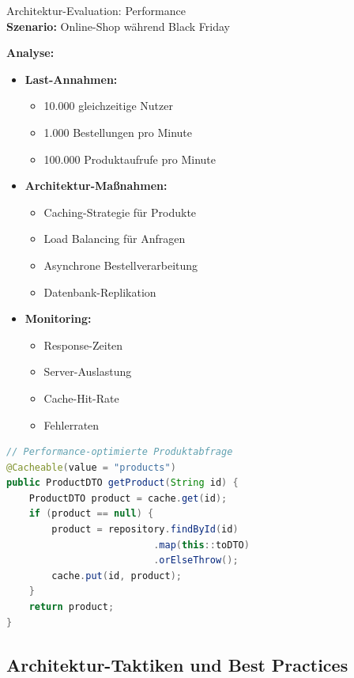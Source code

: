 \begin{example2}{Architektur-Evaluation: Performance}\\
\textbf{Szenario:} Online-Shop während Black Friday

\textbf{Analyse:}
\begin{itemize}
    \item \textbf{Last-Annahmen:}
    \begin{itemize}
        \item 10.000 gleichzeitige Nutzer
        \item 1.000 Bestellungen pro Minute
        \item 100.000 Produktaufrufe pro Minute
    \end{itemize}
    
    \item \textbf{Architektur-Maßnahmen:}
    \begin{itemize}
        \item Caching-Strategie für Produkte
        \item Load Balancing für Anfragen
        \item Asynchrone Bestellverarbeitung
        \item Datenbank-Replikation
    \end{itemize}
    
    \item \textbf{Monitoring:}
    \begin{itemize}
        \item Response-Zeiten
        \item Server-Auslastung
        \item Cache-Hit-Rate
        \item Fehlerraten
    \end{itemize}
\end{itemize}

\begin{lstlisting}[language=Java, style=basesmol]
// Performance-optimierte Produktabfrage
@Cacheable(value = "products")
public ProductDTO getProduct(String id) {
    ProductDTO product = cache.get(id);
    if (product == null) {
        product = repository.findById(id)
                          .map(this::toDTO)
                          .orElseThrow();
        cache.put(id, product);
    }
    return product;
}
\end{lstlisting}
\end{example2}

\subsection{Architektur-Taktiken und Best Practices}

